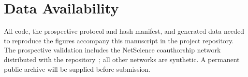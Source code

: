 \documentclass[aps,pre,reprint,superscriptaddress,longbibliography]{revtex4-2}
\begin{document}
\section*{Data Availability}

All code, the prospective protocol and hash manifest, and generated data needed to reproduce the figures accompany this manuscript in the project repository.
The prospective validation includes the NetScience coauthorship network distributed with the repository~\citep{newman2006finding}; all other networks are synthetic.
A permanent public archive will be supplied before submission.



\end{document}
